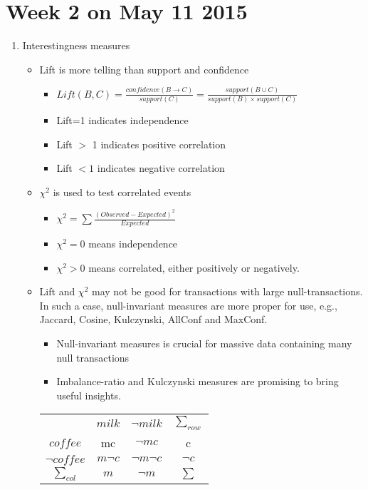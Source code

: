 \documentclass[12pt, a4paper]{article}
\begin{document}
\section{Week 2 on May 11 2015}
\begin{enumerate}
\item Interestingness measures
  \begin{itemize}
  \item Lift is more telling than support and confidence
   \begin{itemize}
   \item $Lift(B,C) = \frac{confidence(B \rightarrow C)}{support(C)} = \frac{support(B \cup C)}{support(B) \times support(C)}$
   \item Lift=1 indicates independence
   \item Lift $>$ 1 indicates positive correlation
   \item Lift $<1$ indicates negative correlation
   \end{itemize}
   
 \item $\chi ^2$ is used to test correlated events
 \begin{itemize}
  \item $\chi ^2=\sum \frac{(Observed - Expected)^2}{Expected}$
  \item $\chi ^2=0 $ means independence 
  \item $\chi ^2 >0$ means correlated, either positively or negatively.
 \end{itemize}
 
 \item Lift and $\chi ^2$ may not be good for transactions with large null-transactions. In such a case, null-invariant measures are more proper for use, e.g., Jaccard, Cosine, Kulczynski, AllConf and MaxConf.
 \begin{itemize}
 \item Null-invariant measures is crucial for massive data containing many null transactions
 \item Imbalance-ratio and Kulczynski measures are promising to bring useful insights.
 \end{itemize}

\begin{table}
\centering
\begin{tabular}{| c | c | c | c |}
\hline
 & $milk$ & $\neg milk$ & $\sum_{row}$ \\
$coffee$ & mc & $\neg m c$ & c \\
$\neg coffee$ & $m \neg c$ & $\neg m \neg c$ & $\neg c$ \\
$\sum_{col}$ & $m$ & $\neg m$ & $\sum$ \\ 
\hline
\end{tabular}
\end{table} 
\end{itemize}


\end{enumerate}
\end{document}
